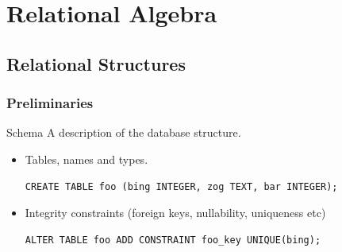 \chapter{Relational Algebra}

\section{Relational Structures}

\subsection{Preliminaries}
\begin{definitionbox}{Schema}
  A description of the database structure.
  \begin{itemize}
    \item {Tables, names and types.
          \begin{verbatim}
CREATE TABLE foo (bing INTEGER, zog TEXT, bar INTEGER); 
            \end{verbatim}
          }
    \item {Integrity constraints (foreign keys, nullability, uniqueness etc)
          \begin{verbatim}
ALTER TABLE foo ADD CONSTRAINT foo_key UNIQUE(bing);
                \end{verbatim}
          }
  \end{itemize}
\end{definitionbox}


